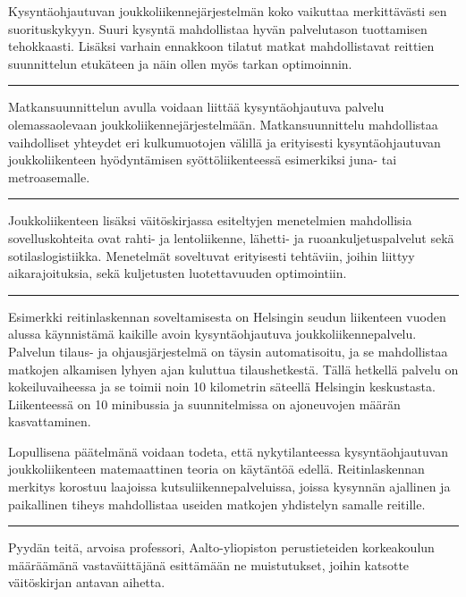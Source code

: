\documentclass[a4paper,12pt]{article}
\newcommand*\sepline{%
  \begin{center}
    \rule[1ex]{.5\textwidth}{.5pt}
  \end{center}}
\begin{document}
Kysyntäohjautuvan joukkoliikennejärjestelmän koko vaikuttaa
merkittävästi sen suorituskykyyn. Suuri kysyntä mahdollistaa hyvän palvelutason tuottamisen tehokkaasti.
Lisäksi varhain ennakkoon tilatut matkat mahdollistavat reittien suunnittelun etukäteen ja näin ollen myös tarkan optimoinnin.

\sepline

Matkansuunnittelun avulla voidaan liittää kysyntäohjautuva palvelu olemassaolevaan joukkoliikennejärjestelmään.
Matkansuunnittelu mahdollistaa vaihdolliset yhteydet eri kulkumuotojen välillä ja erityisesti kysyntäohjautuvan 
joukkoliikenteen hyödyntämisen syöttöliikenteessä esimerkiksi juna- tai metroasemalle.

\sepline

Joukkoliikenteen lisäksi väitöskirjassa esiteltyjen menetelmien mahdollisia sovelluskohteita ovat 
rahti- ja lentoliikenne, lähetti- ja ruoankuljetuspalvelut sekä sotilaslogistiikka. Menetelmät 
soveltuvat erityisesti tehtäviin, joihin liittyy aikarajoituksia, sekä kuljetusten luotettavuuden optimointiin.

\sepline

Esimerkki reitinlaskennan soveltamisesta on
Helsingin seudun liikenteen vuoden alussa käynnistämä kaikille avoin kysyntäohjautuva joukkoliikennepalvelu.
Palvelun tilaus- ja ohjausjärjestelmä on täysin automatisoitu, ja se mahdollistaa matkojen alkamisen lyhyen ajan
kuluttua tilaushetkestä. Tällä hetkellä palvelu on kokeiluvaiheessa ja se toimii noin 10 kilometrin 
säteellä Helsingin keskustasta. Liikenteessä on 10 minibussia ja suunnitelmissa on ajoneuvojen määrän kasvattaminen.

Lopullisena päätelmänä voidaan todeta, että nykytilanteessa kysyntäohjautuvan joukkoliikenteen matemaattinen teoria on käytäntöä edellä.
Reitinlaskennan merkitys korostuu laajoissa kutsuliikennepalveluissa, joissa kysynnän
ajallinen ja paikallinen tiheys mahdollistaa useiden matkojen yhdistelyn samalle reitille. 

\sepline

Pyydän teitä, arvoisa professori, Aalto-yliopiston perustieteiden korkeakoulun määräämänä vastaväittäjänä esittämään ne 
muistutukset, joihin katsotte väitöskirjan antavan aihetta.
\end{document}
